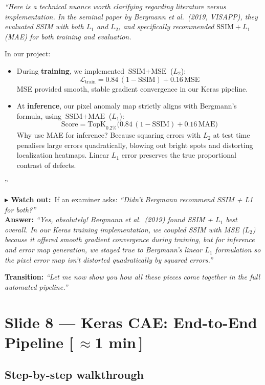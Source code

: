 \documentclass[12pt, a4paper]{article}
\newcommand{\say}[1]{%
  \begin{mdframed}[style=saybox]
  \itshape ``#1''
  \end{mdframed}
}
\newcommand{\warn}[1]{%
  \begin{mdframed}[style=warnbox]
  \textbf{\color{warnorange}$\blacktriangleright$ Watch out:}\ #1
  \end{mdframed}
}
\newcommand{\timing}[1]{\hfill{\small\color{muted}[\,\textbf{#1}\,]}}
\newcommand{\transition}[1]{\vspace{4pt}\noindent\textbf{\color{accent}Transition:} \textit{``#1''}\vspace{4pt}}
\begin{document}
\say{Here is a technical nuance worth clarifying regarding literature versus implementation. In the seminal paper by Bergmann et al.\ (2019, VISAPP), they evaluated SSIM with both $L_1$ and $L_2$, and specifically recommended $\text{SSIM} + L_1$ (MAE) for both training and evaluation.

In our project:
\begin{itemize}[topsep=2pt,itemsep=2pt]
  \item During \textbf{training}, we implemented $\text{SSIM} + \text{MSE}$ ($L_2$):
  \[
    \mathcal{L}_\text{train} = 0.84\,(1-\mathrm{SSIM}) + 0.16\,\mathrm{MSE}
  \]
  MSE provided smooth, stable gradient convergence in our Keras pipeline.
  \item At \textbf{inference}, our pixel anomaly map strictly aligns with Bergmann's formula, using $\text{SSIM} + \text{MAE}$ ($L_1$):
  \[
    \text{Score} = \mathrm{TopK}_{0.2\%}\!\bigl(0.84\,(1-\mathrm{SSIM}) + 0.16\,\mathrm{MAE}\bigr)
  \]
  Why use MAE for inference? Because squaring errors with $L_2$ at test time penalises large errors quadratically, blowing out bright spots and distorting localization heatmaps. Linear $L_1$ error preserves the true proportional contrast of defects.
\end{itemize}}

\warn{If an examiner asks: \textit{``Didn't Bergmann recommend SSIM + L1 for both?''} \\
\textbf{Answer:} \textit{``Yes, absolutely! Bergmann et al.\ (2019) found SSIM + $L_1$ best overall. In our Keras training implementation, we coupled SSIM with MSE ($L_2$) because it offered smooth gradient convergence during training, but for inference and error map generation, we stayed true to Bergmann's linear $L_1$ formulation so the pixel error map isn't distorted quadratically by squared errors.''}}

\transition{Let me now show you how all these pieces come together in the full automated pipeline.}

\vspace{1em}

\section{Slide 8 --- Keras CAE: End-to-End Pipeline \timing{$\approx$1 min}}

\subsection{Step-by-step walkthrough}
\end{document}
